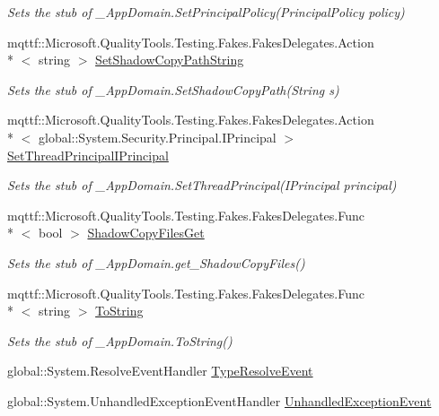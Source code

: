 \begin{DoxyCompactItemize}
\begin{DoxyCompactList}\small\item\em Sets the stub of \-\_\-\-App\-Domain.\-Set\-Principal\-Policy(\-Principal\-Policy policy)\end{DoxyCompactList}\item 
mqttf\-::\-Microsoft.\-Quality\-Tools.\-Testing.\-Fakes.\-Fakes\-Delegates.\-Action\\*
$<$ string $>$ \hyperlink{class_system_1_1_fakes_1_1_stub___app_domain_a1caf2de1a0e4c69be0352a5208795cd0}{Set\-Shadow\-Copy\-Path\-String}
\begin{DoxyCompactList}\small\item\em Sets the stub of \-\_\-\-App\-Domain.\-Set\-Shadow\-Copy\-Path(\-String s)\end{DoxyCompactList}\item 
mqttf\-::\-Microsoft.\-Quality\-Tools.\-Testing.\-Fakes.\-Fakes\-Delegates.\-Action\\*
$<$ global\-::\-System.\-Security.\-Principal.\-I\-Principal $>$ \hyperlink{class_system_1_1_fakes_1_1_stub___app_domain_a9a56b04fd94aa38785fea2a424c16cdb}{Set\-Thread\-Principal\-I\-Principal}
\begin{DoxyCompactList}\small\item\em Sets the stub of \-\_\-\-App\-Domain.\-Set\-Thread\-Principal(\-I\-Principal principal)\end{DoxyCompactList}\item 
mqttf\-::\-Microsoft.\-Quality\-Tools.\-Testing.\-Fakes.\-Fakes\-Delegates.\-Func\\*
$<$ bool $>$ \hyperlink{class_system_1_1_fakes_1_1_stub___app_domain_ae4e125c83952e86bfa0ba8145f80b388}{Shadow\-Copy\-Files\-Get}
\begin{DoxyCompactList}\small\item\em Sets the stub of \-\_\-\-App\-Domain.\-get\-\_\-\-Shadow\-Copy\-Files()\end{DoxyCompactList}\item 
mqttf\-::\-Microsoft.\-Quality\-Tools.\-Testing.\-Fakes.\-Fakes\-Delegates.\-Func\\*
$<$ string $>$ \hyperlink{class_system_1_1_fakes_1_1_stub___app_domain_af58f774ad561eb2e596ebdad047d9a29}{To\-String}
\begin{DoxyCompactList}\small\item\em Sets the stub of \-\_\-\-App\-Domain.\-To\-String()\end{DoxyCompactList}\item 
global\-::\-System.\-Resolve\-Event\-Handler \hyperlink{class_system_1_1_fakes_1_1_stub___app_domain_a839441369c178f5cdf4b381557e0d51d}{Type\-Resolve\-Event}
\item 
global\-::\-System.\-Unhandled\-Exception\-Event\-Handler \hyperlink{class_system_1_1_fakes_1_1_stub___app_domain_a535c305af1bd6271748a45fe715e72cb}{Unhandled\-Exception\-Event}
\end{DoxyCompactItemize}


